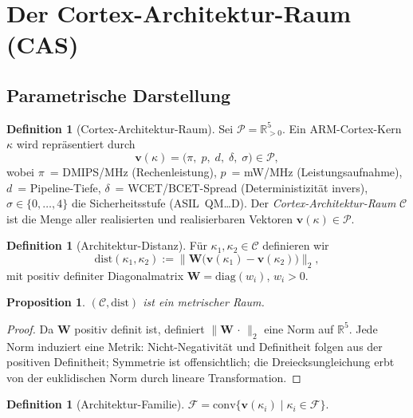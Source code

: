 ﻿\documentclass[a4paper,12pt]{article}
\theoremstyle{plain}
\newtheorem{proposition}[theorem]{Proposition}
\theoremstyle{definition}
\newtheorem{definition}[theorem]{Definition}
\theoremstyle{remark}
\begin{document}
\section{Der Cortex-Architektur-Raum (CAS)}\label{sec:cas}

\subsection{Parametrische Darstellung}

\begin{definition}[Cortex-Architektur-Raum]\label{def:cas}
Sei $\mathcal{P}=\mathbb{R}_{>0}^5$.
Ein ARM-Cortex-Kern $\kappa$ wird repr\"asentiert durch
\[
  \mathbf{v}(\kappa)=\bigl(\pi,\;p,\;d,\;\delta,\;\sigma\bigr)\in\mathcal{P},
\]
wobei $\pi$~= DMIPS/MHz (Rechenleistung), $p$~= mW/MHz (Leistungsaufnahme),
$d$~= Pipeline-Tiefe, $\delta$~= WCET/BCET-Spread (Deterministizit\"at invers),
$\sigma\in\{0,\ldots,4\}$ die Sicherheitsstufe (ASIL~QM\ldots{}D).
Der \emph{Cortex-Architektur-Raum} $\mathcal{C}$ ist die Menge aller
realisierten und realisierbaren Vektoren $\mathbf{v}(\kappa)\in\mathcal{P}$.
\end{definition}

\begin{definition}[Architektur-Distanz]\label{def:dist}
F\"ur $\kappa_1,\kappa_2\in\mathcal{C}$ definieren wir
\[
  \mathrm{dist}(\kappa_1,\kappa_2)
  :=\bigl\|\mathbf{W}\bigl(\mathbf{v}(\kappa_1)-\mathbf{v}(\kappa_2)\bigr)\bigr\|_2,
\]
mit positiv definiter Diagonalmatrix $\mathbf{W}=\mathrm{diag}(w_i)$, $w_i>0$.
\end{definition}

\begin{proposition}\label{prop:metric}
$(\mathcal{C},\mathrm{dist})$ ist ein metrischer Raum.
\end{proposition}
\begin{proof}
Da $\mathbf{W}$ positiv definit ist, definiert $\|\mathbf{W}\,\cdot\,\|_2$
eine Norm auf $\mathbb{R}^5$. Jede Norm induziert eine Metrik:
Nicht-Negativit\"at und Definitheit folgen aus der positiven Definitheit;
Symmetrie ist offensichtlich; die Dreiecksungleichung erbt von der
euklidischen Norm durch lineare Transformation.
\end{proof}

\begin{definition}[Architektur-Familie]\label{def:family}
$\mathcal{F}=\mathrm{conv}\{\mathbf{v}(\kappa_i)\mid\kappa_i\in\mathcal{F}\}$.
\end{definition}
\end{document}
